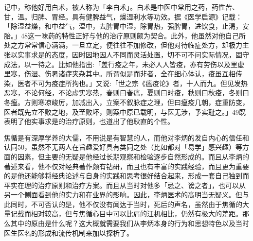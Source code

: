 \vfill
\begin{BookNotes}
\end{BookNotes}

\noindent 记中，称他好用白术，被人称为「李白术」。白术是中医中常用之药，药性苦、甘，温。归脾、胃经。具有健脾益气，燥湿利水等功效。据《医学启源》记载：「除湿益燥，和中益气，温中，去脾胃中湿，除胃热，强脾胃，进饮食，止渴，安胎。」48这一味药的特性正好与他的治疗原则颇为契合。此外，他虽然对他自己所处之方常常信心满满，一旦立定，便往往不加修改，但他对待临症处方，却极力主张以实事求是的态度，因时因地因人不同而灵活处置，切不可不问实际情况，固守成法，以一待之。比如他指出:「盖行疫之年，未必人人皆疫，亦有劳伤以及里虚里寒，伤湿、伤暑诸症夹杂其中。所谓似是而非者，全在细心体认，疫虽互相传染，医者不可为疫症所拘也。」又说:「世之宗《瘟疫论》者，十人而九。但见发热恶寒，不论何经，不论虚实寒热，春则曰春瘟，夏则曰时疫，秋则曰秋疫，冬则曰冬瘟。方则寒凉峻厉，加减出入，立案不叙脉症之理，但曰瘟疫几朝，症重防变，医者既先立不败之地，及至败坏，则案中原已载明，与医无涉，予实耻之。」49既表明了他实事求是的治疗原则，也道出了他耿直的个性。

焦循是有深厚学养的大儒，不用说是有智慧的人，而他对李炳的发自内心的信任和认同50，虽然不无两人在旨趣爱好具有类同之处（比如都对「易学」感兴趣）等方面的因素，但主要的无疑是他经过长期观察和检验逐步自然形成的。而且从李炳的著述来看，他不仅对经典著作颇有钻研，而且也有丰富的实践经验，而且更为重要的是他还能够将经典论述与自身的实践和思考很好结合起来，形成一套自己独到而平实在理的治疗原则和治疗方案。而且从当时对他多「忌之、谤之者」，也可以从另一个侧面看到他的实力和在业界的影响。因此，李炳医术的高明当无疑义。但与此同时，不可否认的是，他不仅没有闻达于当时，死后的声名，虽然由于焦循的大量记载而相对较高，但与焦循心目中可以比肩的汪机相比，仍然有极大的差距。那么其中的原由是什么呢？这大概就需要我们从李炳本身的行为和思想特色以及当时医生医名的形成和流传机制来加以探析了。

\vfill
\begin{BookNotes}
\end{BookNotes}

